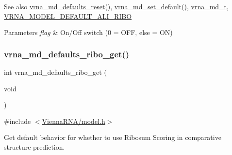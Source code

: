 \begin{DoxySeeAlso}{See also}
\hyperlink{group__model__details_ga70834424cf804d149937de89f80ceb45}{vrna\+\_\+md\+\_\+defaults\+\_\+reset()}, \hyperlink{group__model__details_ga8ac6ff84936282436f822644bf841f66}{vrna\+\_\+md\+\_\+set\+\_\+default()}, \hyperlink{group__model__details_ga1f8a10e12a0a1915f2a4eff0b28ea17c}{vrna\+\_\+md\+\_\+t}, \hyperlink{group__model__details_ga64b3ab65a9ca42d4ad1d05e193083147}{V\+R\+N\+A\+\_\+\+M\+O\+D\+E\+L\+\_\+\+D\+E\+F\+A\+U\+L\+T\+\_\+\+A\+L\+I\+\_\+\+R\+I\+BO} 
\end{DoxySeeAlso}

\begin{DoxyParams}{Parameters}
{\em flag} & On/\+Off switch (0 = O\+FF, else = ON) \\
\hline
\end{DoxyParams}
\mbox{\label{group__model__details_ga169027f0c0561ea7d87b655e4b336bfc}} 
\subsubsection{\texorpdfstring{vrna\+\_\+md\+\_\+defaults\+\_\+ribo\+\_\+get()}{vrna\_md\_defaults\_ribo\_get()}}
{\footnotesize\ttfamily int vrna\+\_\+md\+\_\+defaults\+\_\+ribo\+\_\+get (\begin{DoxyParamCaption}\item[{void}]{ }\end{DoxyParamCaption})}



{\ttfamily \#include $<$\hyperlink{model_8h}{Vienna\+R\+N\+A/model.\+h}$>$}



Get default behavior for whether to use Ribosum Scoring in comparative structure prediction. 

